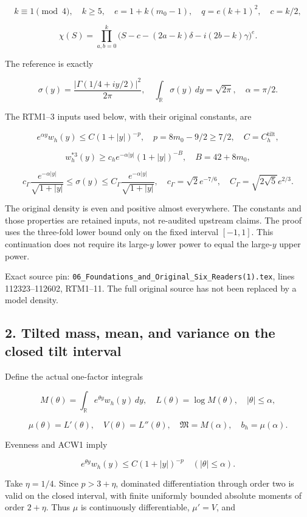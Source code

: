 \[
k\equiv1\pmod4,\quad k\ge5,\quad e=1+k(m_0-1),\quad
q=e(k+1)^2,\quad c=k/2,
\]

\[
\chi(S)=\prod_{a,b=0}^k
\bigl(S-c-(2a-k)\delta-i(2b-k)\gamma\bigr)^e.
\]

The reference is exactly

\[
\sigma(y)=\frac{|\Gamma(1/4+iy/2)|^2}{2\pi},\quad
\int_{\mathbb R}\sigma(y)\,dy=\sqrt{2\pi},\quad \alpha=\pi/2.
\]

The RTM1--3 inputs used below, with their original constants, are

\[
e^{\alpha y}w_h(y)\le C(1+|y|)^{-p},\quad
p=8m_0-9/2\ge7/2,\quad C=C_h^{\mathrm{tilt}},
\tag{ACW1}
\]

\[
w_h^{*3}(y)\ge c_h e^{-\alpha|y|}(1+|y|)^{-B},
\quad B=42+8m_0,
\]

\[
c_\Gamma\frac{e^{-\alpha|y|}}{\sqrt{1+|y|}}
\le\sigma(y)\le
C_\Gamma\frac{e^{-\alpha|y|}}{\sqrt{1+|y|}},
\quad
c_\Gamma=\sqrt2e^{-7/6},\quad
C_\Gamma=\sqrt{2\sqrt5}e^{2/3}.
\]

The original density is even and positive almost everywhere. The constants and those properties are retained inputs, not re-audited upstream claims. The proof uses the three-fold lower bound only on the fixed interval \([-1,1]\). This continuation does not require its large-\(y\) lower power to equal the large-\(y\) upper power.

Exact source pin: \texttt{06\_Foundations\_and\_Original\_Six\_Readers(1).tex}, lines 112323--112602, RTM1--11. The full original source has not been replaced by a model density.

\subsection{2. Tilted mass, mean, and variance on the closed tilt interval}\label{tilted-mass-mean-and-variance-on-the-closed-tilt-interval}

Define the actual one-factor integrals

\[
M(\theta)=\int_{\mathbb R}e^{\theta y}w_h(y)\,dy,
\quad L(\theta)=\log M(\theta),\quad |\theta|\le\alpha,
\]

\[
\mu(\theta)=L'(\theta),\quad V(\theta)=L''(\theta),\quad
\mathfrak M=M(\alpha),\quad b_h=\mu(\alpha).
\tag{ACW2}
\]

Evenness and ACW1 imply

\[
e^{\theta y}w_h(y)\le C(1+|y|)^{-p}
\quad(|\theta|\le\alpha).
\]

Take \(\eta=1/4\). Since \(p>3+\eta\), dominated differentiation through order two is valid on the closed interval, with finite uniformly bounded absolute moments of order \(2+\eta\). Thus \(\mu\) is continuously differentiable, \(\mu'=V\), and


